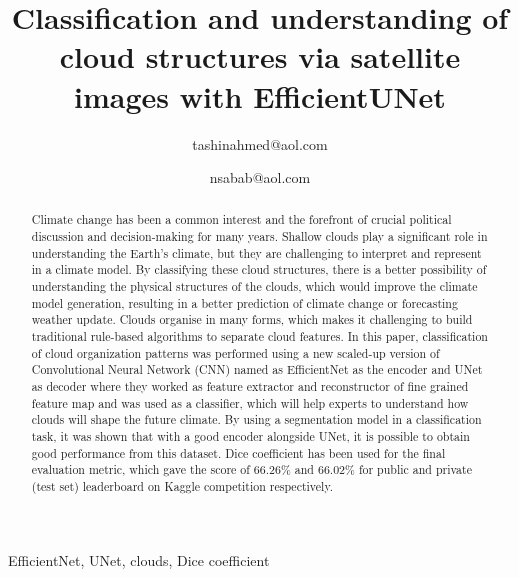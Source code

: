 \documentclass[conference]{IEEEtran}
\begin{document}
\title{Classification and understanding of cloud structures via satellite images with EfficientUNet\\
}

\author{
tashinahmed@aol.com
\and
{}
nsabab@aol.com
}

\maketitle

\begin{abstract}

Climate change has been a common interest and the forefront of crucial political discussion and decision-making for many years. Shallow clouds play a significant role in understanding the Earth's climate, but they are challenging to interpret and represent in a climate model. By classifying these cloud structures, there is a better possibility of understanding the physical structures of the clouds, which would improve the climate model generation, resulting in a better prediction of climate change or forecasting weather update. Clouds organise in many forms, which makes it challenging to build traditional rule-based algorithms to separate cloud features. In this paper, classification of cloud organization patterns was performed using a new scaled-up version of Convolutional Neural Network (CNN) named as EfficientNet as the encoder and UNet as decoder where they worked as feature extractor and reconstructor of fine grained feature map and was used as a classifier, which will help experts to understand how clouds will shape the future climate. By using a segmentation model in a classification task, it was shown that with a good encoder alongside UNet, it is possible to obtain good performance from this dataset. Dice coefficient has been used for the final evaluation metric, which gave the score of 66.26\% and 66.02\% for public and private (test set) leaderboard on Kaggle competition respectively.

\end{abstract}

\begin{IEEEkeywords}
EfficientNet, UNet, clouds, Dice coefficient
\end{IEEEkeywords}
\end{document}
